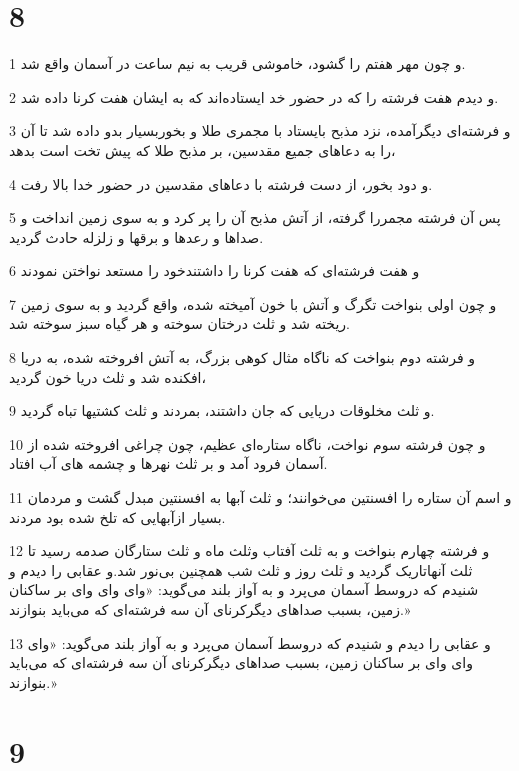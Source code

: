 \chapter{8}

\par 1 و چون مهر هفتم را گشود، خاموشی قریب به نیم ساعت در آسمان واقع شد.
\par 2 و دیدم هفت فرشته را که در حضور خد ایستاده‌اند که به ایشان هفت کرنا داده شد.
\par 3 و فرشته‌ای دیگرآمده، نزد مذبح بایستاد با مجمری طلا و بخوربسیار بدو داده شد تا آن را به دعاهای جمیع مقدسین، بر مذبح طلا که پیش تخت است بدهد،
\par 4 و دود بخور، از دست فرشته با دعاهای مقدسین در حضور خدا بالا رفت.
\par 5 پس آن فرشته مجمررا گرفته، از آتش مذبح آن را پر کرد و به سوی زمین انداخت و صداها و رعدها و برقها و زلزله حادث گردید.
\par 6 و هفت فرشته‌ای که هفت کرنا را داشتندخود را مستعد نواختن نمودند
\par 7 و چون اولی بنواخت تگرگ و آتش با خون آمیخته شده، واقع گردید و به سوی زمین ریخته شد و ثلث درختان سوخته و هر گیاه سبز سوخته شد.
\par 8 و فرشته دوم بنواخت که ناگاه مثال کوهی بزرگ، به آتش افروخته شده، به دریا افکنده شد و ثلث دریا خون گردید،
\par 9 و ثلث مخلوقات دریایی که جان داشتند، بمردند و ثلث کشتیها تباه گردید.
\par 10 و چون فرشته سوم نواخت، ناگاه ستاره‌ای عظیم، چون چراغی افروخته شده از آسمان فرود آمد و بر ثلث نهرها و چشمه های آب افتاد.
\par 11 و اسم آن ستاره را افسنتین می‌خوانند؛ و ثلث آبها به افسنتین مبدل گشت و مردمان بسیار ازآبهایی که تلخ شده بود مردند.
\par 12 و فرشته چهارم بنواخت و به ثلث آفتاب وثلث ماه و ثلث ستارگان صدمه رسید تا ثلث آنهاتاریک گردید و ثلث روز و ثلث شب همچنین بی‌نور شد.و عقابی را دیدم و شنیدم که دروسط آسمان می‌پرد و به آواز بلند می‌گوید: «وای وای وای بر ساکنان زمین، بسبب صداهای دیگرکرنای آن سه فرشته‌ای که می‌باید بنوازند.»
\par 13 و عقابی را دیدم و شنیدم که دروسط آسمان می‌پرد و به آواز بلند می‌گوید: «وای وای وای بر ساکنان زمین، بسبب صداهای دیگرکرنای آن سه فرشته‌ای که می‌باید بنوازند.»

\chapter{9}

